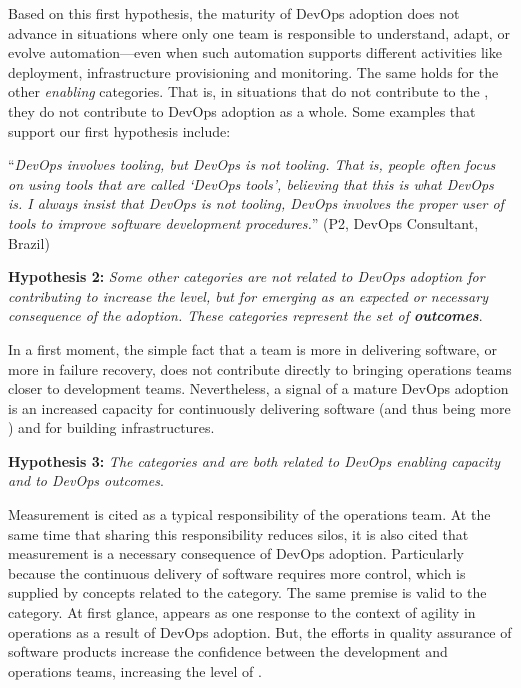 Based on this first hypothesis, the maturity of DevOps adoption does not
advance in situations where only one team is responsible to understand, adapt, or
evolve automation---even when such automation supports different activities like
deployment, infrastructure provisioning and monitoring. The same holds for the
other \emph{enabling} categories. That is, in situations that
 do not contribute to
the \cc, they do not contribute to DevOps adoption as a whole. Some examples
that support our first hypothesis include:

\begin{mq}
``\emph{DevOps involves tooling, but DevOps is not tooling. That is, people often
focus on using tools that are called `DevOps tools', believing that this is
what DevOps is. I always insist that DevOps is not tooling, DevOps involves the
proper user of tools to improve software development procedures.}'' (P2, DevOps
Consultant, Brazil)
\end{mq}

\begin{mh}
\textbf{Hypothesis 2:} \textit{Some other categories are not related to DevOps
adoption for contributing to increase the} \cc \emph{level, but for emerging
as an expected or necessary consequence of the adoption. These categories
represent the set of \textbf{outcomes}}.
\end{mh}

In a first moment, the simple fact that a team is more
 in delivering software, or more  in failure recovery, does not
contribute directly to bringing operations teams closer to development teams.
Nevertheless, a signal of a mature DevOps adoption is an increased capacity for continuously
delivering software (and thus being more )
and for building  infrastructures.

\begin{mh}
\textbf{Hypothesis 3:} \textit{The categories  and 
are both related to DevOps enabling capacity and to DevOps outcomes}.
\end{mh}

Measurement is cited as a typical responsibility of the operations team.
At the same time that sharing this responsibility reduces silos,
it is also cited that measurement is a necessary consequence of DevOps adoption. Particularly because
the continuous delivery of software requires more control,
which is supplied by concepts related to the  category.
The same premise is valid to the  category. At first glance,
 appears as one response to the context of agility in operations
as a result of DevOps adoption. But, the efforts in quality assurance of software products
increase the confidence between the development and operations teams, increasing the level
of \cc.

